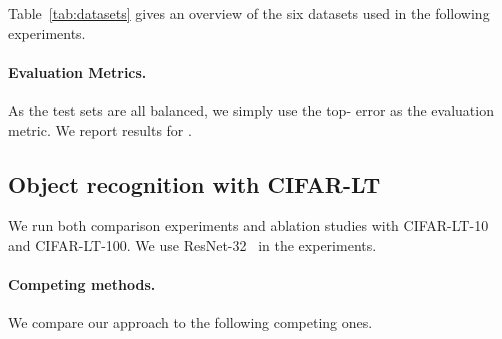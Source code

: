Table~\ref{tab:datasets} gives an overview of the six datasets used in the following experiments. 

\vspace{-10pt}
\paragraph{Evaluation Metrics.}
As the test sets are all balanced, we simply use the top- error as the evaluation metric. We report results for .




\subsection{Object recognition with CIFAR-LT} \label{sec-exp-cifar}
We run both comparison experiments and ablation studies with CIFAR-LT-10 and CIFAR-LT-100. We use ResNet-32~\cite{Resnet} in the experiments.

\vspace{-10pt}
\paragraph{Competing methods.}
We compare our approach to the following competing ones.


